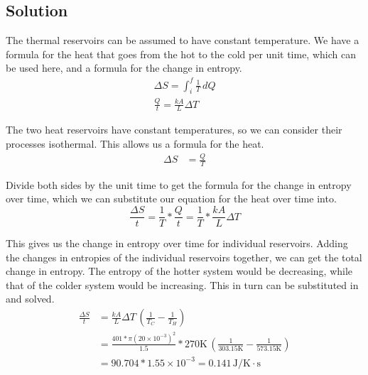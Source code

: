 \documentclass[12pt]{article}
\newcommand{\E}[1]{\times 10^{#1}}
\begin{document}
        \subsection{Solution}
            The thermal reservoirs can be assumed to have constant temperature. 
            We have a formula for the heat that goes from the hot to the cold per unit time, which can be used here, and a formula for the change in entropy.
            \begin{gather}
                \Delta S    =   \int_{i}^{f} \frac{1}{T}\,dQ\\
                \frac{Q}{t} =   \frac{kA}{L}\Delta T
            \end{gather}

            The two heat reservoirs have constant temperatures, so we can consider their processes isothermal.
            This allows us a formula for the heat.
            \begin{align}
                \Delta S    &=  \frac{Q}{T}
            \end{align}

            Divide both sides by the unit time to get the formula for the change in entropy over time, which we can substitute our equation for the heat over time into.
            \begin{equation}
                \frac{\Delta S}{t}  =   \frac{1}{T} * \frac{Q}{t}
                    =   \frac{1}{T} * \frac{kA}{L}\Delta T
            \end{equation}

            This gives us the change in entropy over time for individual reservoirs.
            Adding the changes in entropies of the individual reservoirs together, we can get the total change in entropy.
            The entropy of the hotter system would be decreasing, while that of the colder system would be increasing.
            This in turn can be substituted in and solved.
            \begin{align}
                \frac{\Delta S}{t}  &=  \frac{kA}{L}\Delta T\,\left( \frac{1}{T_C} - \frac{1}{T_H} \right)\\
                    &=  \frac{401 * \pi (20\E{-3})^2}{1.5}*270\unit{\kelvin}\,\left( \frac{1}{303.15\unit{\kelvin}} - \frac{1}{573.15\unit{\kelvin}} \right)\\
                    &=  90.704 * 1.55\E{-3}
                    =   \boxed{0.141\,\unit{\joule/\kelvin\cdot\second}}
            \end{align}
\end{document}
